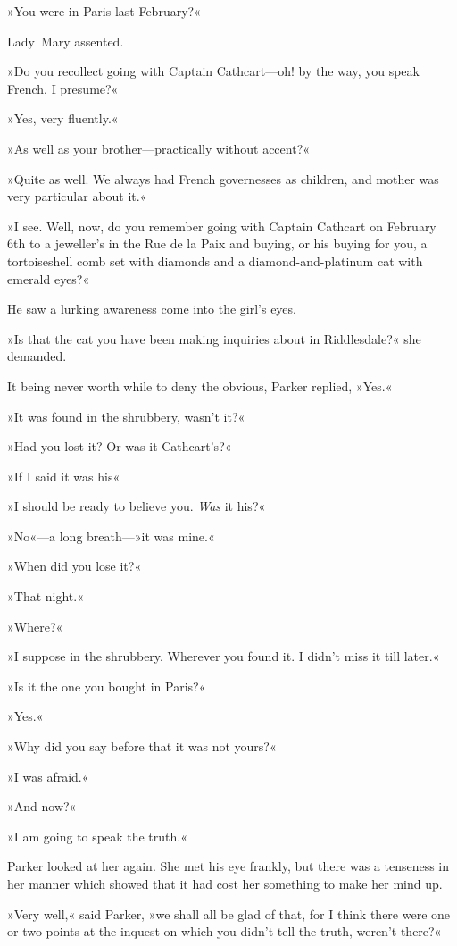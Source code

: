 »You were in Paris last February?«

Lady~Mary assented.

»Do you recollect going with Captain Cathcart—oh! by the way, you speak French, I presume?«

»Yes, very fluently.«

»As well as your brother—practically without accent?«

»Quite as well. We always had French governesses as children, and mother was very particular about it.«

»I see. Well, now, do you remember going with Captain Cathcart on February 6th to a jeweller's in the Rue de la Paix and buying, or his buying for you, a tortoiseshell comb set with diamonds and a diamond-and-platinum cat with emerald eyes?«

He saw a lurking awareness come into the girl's eyes.

»Is that the cat you have been making inquiries about in Riddlesdale?« she demanded.

It being never worth while to deny the obvious, Parker replied, »Yes.«

»It was found in the shrubbery, wasn't it?«

»Had you lost it? Or was it Cathcart's?«

»If I said it was his\longdash«

»I should be ready to believe you. \textit{Was} it his?«

»No«—a long breath—»it was mine.«

»When did you lose it?«

»That night.«

»Where?«

»I suppose in the shrubbery. Wherever you found it. I didn't miss it till later.«

»Is it the one you bought in Paris?«

»Yes.«

»Why did you say before that it was not yours?«

»I was afraid.«

»And now?«

»I am going to speak the truth.«

Parker looked at her again. She met his eye frankly, but there was a tenseness in her manner which showed that it had cost her something to make her mind up.

»Very well,« said Parker, »we shall all be glad of that, for I think there were one or two points at the inquest on which you didn't tell the truth, weren't there?«

